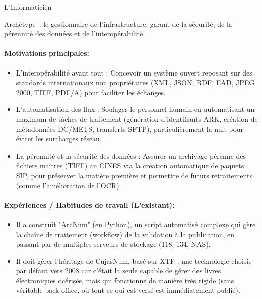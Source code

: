 L’Informaticien

Archétype : le gestionnaire de l’infrastructure, garant de la sécurité, de la pérennité des 
données et de l’interopérabilité.

\paragraph*{Motivations principales:}
\begin{itemize}
	\item L'interopérabilité avant tout : Concevoir un système ouvert reposant sur des standards internationaux non propriétaires (XML, JSON, RDF, EAD, JPEG 2000, TIFF, PDF/A) pour faciliter les échanges.
\item L'automatisation des flux : Soulager le personnel humain en automatisant un maximum de tâches de traitement (génération d'identifiants ARK, création de métadonnées DC/METS, transferts SFTP), particulièrement la nuit pour éviter les surcharges réseau.
\item La pérennité et la sécurité des données : Assurer un archivage pérenne des fichiers maîtres (TIFF) au CINES via la création automatique de paquets SIP, pour préserver la matière première et permettre de futurs retraitements (comme l'amélioration de l'OCR).
\end{itemize}
\paragraph*{Expériences / Habitudes de travail (L'existant):}
\begin{itemize}
	\item Il a construit "ArcNum" (en Python), un script automatisé complexe qui gère la chaîne de traitement (workflow) de la validation à la publication, en passant par de multiples serveurs de stockage (118, 134, NAS).
\item Il doit gérer l'héritage de CujasNum, basé sur XTF : une technologie choisie par défaut vers 2008 car c'était la seule capable de gérer des livres électroniques océrisés, mais qui fonctionne de manière très rigide (sans véritable back-office, où tout ce qui est versé est immédiatement publié).
\end{itemize}
